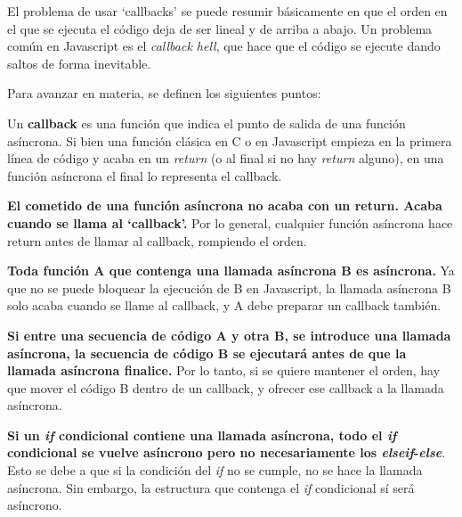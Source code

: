 \documentclass{report}
\begin{document}
	\vspace{10px}

	El problema de usar `callbacks' se puede resumir básicamente en que el orden en el que se ejecuta el código deja de ser lineal y de arriba a abajo. Un problema común en Javascript es el \textit{callback hell}\cite{callbackhell}, que hace que el código se ejecute dando saltos de forma inevitable. 
	
	Para avanzar en materia, se definen los siguientes puntos:
	
	\noindent
	Un \textbf{callback} es una función que indica el punto de salida de una función asíncrona. Si bien una función clásica en C o en Javascript empieza en la primera línea de código y acaba en un \textit{return} (o al final si no hay \textit{return} alguno), en una función asíncrona el final lo representa el callback.  
	
	\vspace{10px}
	
	\noindent
	\textbf{El cometido de una función asíncrona no acaba con un return. Acaba cuando se llama al `callback'.} Por lo general, cualquier función asíncrona hace return antes de llamar al callback, rompiendo el orden.
	
	\vspace{10px}
	
	\noindent
	\textbf{Toda función A que contenga una llamada asíncrona B es asíncrona.} Ya que no se puede bloquear la ejecución de B en Javascript, la llamada asíncrona B solo acaba cuando se llame al callback, y A debe preparar un callback también.
	
	\vspace{10px}
	
	\noindent
	\textbf{Si entre una secuencia de código A y otra B, se introduce una llamada asíncrona, la secuencia de código B se ejecutará antes de que la llamada asíncrona finalice.} Por lo tanto, si se quiere mantener el orden, hay que mover el código B dentro de un callback, y ofrecer ese callback a la llamada asíncrona.
	
	\vspace{10px}
	\noindent
	\textbf{Si un \textit{if} condicional contiene una llamada asíncrona, todo el \textit{if} condicional se vuelve asíncrono pero no necesariamente los \textit{elseif}-\textit{else}}. Esto se debe a que si la condición del \textit{if} no se cumple, no se hace la llamada asíncrona. Sin embargo, la estructura que contenga el \textit{if} condicional sí será asíncrono. 
	
\end{document}
